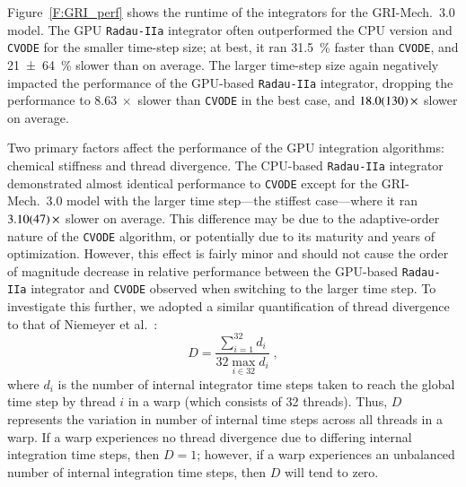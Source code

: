 \documentclass[preprint]{elsarticle}
\begin{document}
Figure~\ref{F:GRI_perf} shows the runtime of the integrators for the GRI-Mech.~3.0 model.
The GPU \texttt{Radau-IIa} integrator often outperformed the CPU version and \texttt{CVODE} for the smaller time-step size; at best, it ran \SI{31.5}{\percent} faster than \texttt{CVODE}, and \SI{21\pm64}{\percent} slower than on average.
The larger time-step size again negatively impacted the performance of the GPU-based \texttt{Radau-IIa} integrator, dropping the performance to $\SI{8.63}{\times}$ slower than \texttt{CVODE} in the best case, and $\SI{18.0\pm13.0}{\times}$ slower on average.

Two primary factors affect the performance of the GPU integration algorithms: chemical stiffness and thread divergence.
The CPU-based \texttt{Radau-IIa} integrator demonstrated almost identical performance to \texttt{CVODE} except for the GRI-Mech.~3.0 model with the larger time step---the stiffest case---where it ran $\SI{3.1\pm0.47}{\times}$ slower on average.
This difference may be due to the adaptive-order nature of the \texttt{CVODE} algorithm, or potentially due to its maturity and years of optimization.
However, this effect is fairly minor and should not cause the order of magnitude decrease in relative performance between the GPU-based \texttt{Radau-IIa} integrator and \texttt{CVODE} observed when switching to the larger time step.
To investigate this further, we adopted a similar quantification of thread divergence to that of Niemeyer et al.~\cite{Niemeyer:2014aa}:
\begin{equation}
	D = \frac{\sum_{i=1}^{32}{d_i}}{32 \max_{i \in 32} d_i} \;,
	\label{eqn:divergence}
\end{equation}
where $d_i$ is the number of internal integrator time steps taken to reach the global time step by thread $i$ in a warp (which consists of 32 threads).
Thus, $D$ represents the variation in number of internal time steps across all threads in a warp.
If a warp experiences no thread divergence due to differing internal integration time steps, then $D = 1$; however, if a warp experiences an unbalanced number of internal integration time steps, then $D$ will tend to zero.
\end{document}
